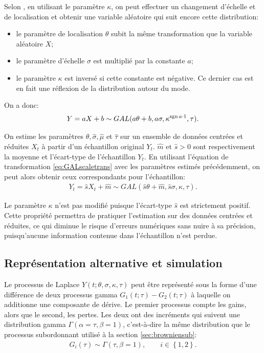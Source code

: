 Selon \cite{kotz2001laplace}, en utilisant le paramètre $\kappa$, on
peut effectuer un changement d'échelle et de localisation et obtenir
une variable aléatoire qui suit encore cette distribution:
\begin{itemize}
\item le paramètre de localisation $\theta$ subit la même
  transformation que la variable aléatoire $X$;
\item le paramètre d'échelle $\sigma$ est multiplié par la constante
  $a$;
\item le paramètre $\kappa$ est inversé si cette constante est
  négative. Ce dernier cas est en fait une réflexion de la
  distribution autour du mode.
\end{itemize}

On a donc:
\begin{align}
  \label{eq:GALscaletrans}
  Y = aX + b \sim GAL(a \theta + b,a\sigma,\kappa^{\operatorname{sgn}{a}\cdot
    1},\tau).
\end{align}

On estime les paramètres $\hat\theta, \hat\sigma, \hat\mu$ et
$\hat\tau$ sur un ensemble de données centrées et réduites $X_t$ à
partir d'un échantillon original $Y_t$. $\hat{m} \text{ et }
\hat{s}>0$ sont respectivement la moyenne et l'écart-type de
l'échantillon $Y_t$. En utilisant l'équation de transformation
\eqref{eq:GALscaletrans} avec les paramètres estimés précédemment, on
peut alors obtenir ceux correspondants pour l'échantillon:
\begin{align}
  \label{eq:transparamGALNS}
  Y_t = \hat{s} X_t + \hat{m} \sim GAL(\hat{s} \theta +
  \hat{m},\hat{s}\sigma,\kappa,\tau) .
\end{align}

Le paramètre $\kappa$ n'est pas modifié puisque l'écart-type $\hat{s}$
est strictement positif. Cette propriété permettra de pratiquer
l'estimation sur des données centrées et réduites, ce qui diminue le
risque d'erreurs numériques sans nuire à sa précision, puisqu'aucune
information contenue dans l'échantillon n'est perdue.

\subsection{Représentation alternative et simulation}
\label{sec:simulationGAL}

Le processus de Laplace $Y(t;\theta,\sigma,\kappa,\tau)$ peut être
représenté sous la forme d'une différence de deux processus gamma
$G_1(t;\tau) - G_2(t;\tau)$ à laquelle on additionne une composante de
dérive. Le premier processus compte les gains, alors que le second,
les pertes. Les deux ont des incréments qui suivent une distribution
gamma $\Gamma(\alpha=\tau, \beta=1)$, c'est-à-dire la même
distribution que le processus
subordonnant utilisé à la section \ref{sec:browniensub}:
\begin{align}
  \label{eq:distributiongammaformealt}
  G_i(\tau) \sim \Gamma\left(\tau,\beta=1 \right), \qquad i\in\left\{
    1,2 \right\}.
\end{align}


